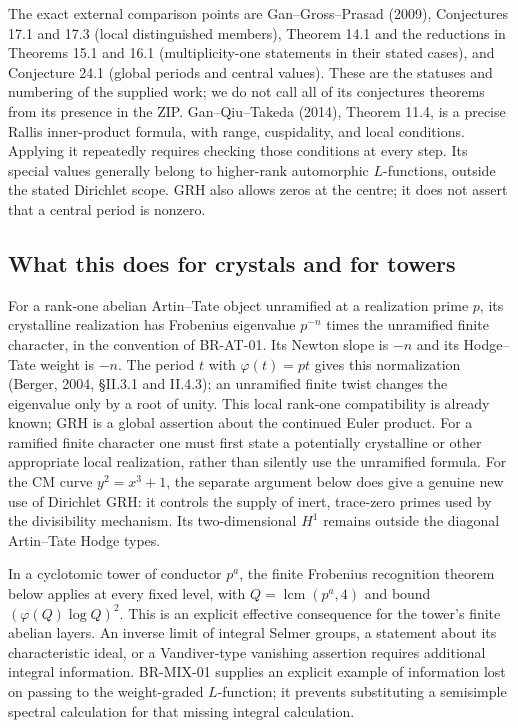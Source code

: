 The exact external comparison points are Gan--Gross--Prasad
(2009), Conjectures 17.1 and 17.3 (local distinguished members),
Theorem 14.1 and the reductions in Theorems 15.1 and 16.1
(multiplicity-one statements in their stated cases), and
Conjecture 24.1 (global periods and central values).  These are
the statuses and numbering of the supplied work; we do not call
all of its conjectures theorems from its presence in the ZIP.
Gan--Qiu--Takeda (2014), Theorem 11.4, is a precise Rallis
inner-product formula, with range, cuspidality, and local
conditions.  Applying it repeatedly requires checking those
conditions at every step.  Its special values generally belong
to higher-rank automorphic $L$-functions, outside the stated
Dirichlet scope.  GRH also allows zeros at the centre; it does
not assert that a central period is nonzero.

\subsection{What this does for crystals and for towers}

For a rank-one abelian Artin--Tate object unramified at a
realization prime $p$, its crystalline realization has Frobenius
eigenvalue $p^{-n}$ times the unramified finite character, in the
convention of BR-AT-01.  Its Newton slope is $-n$ and its
Hodge--Tate weight is $-n$.  The period $t$ with $\varphi(t)=pt$ gives this normalization
(Berger, 2004, \S II.3.1 and II.4.3); an unramified finite twist
changes the eigenvalue only by a root of unity.  This local rank-one
compatibility is already known; GRH is a global assertion about the continued
Euler product.  For a ramified finite character one must first
state a potentially crystalline or other appropriate local
realization, rather than silently use the unramified formula.
For the CM curve $y^2=x^3+1$, the separate argument below does
give a genuine new use of Dirichlet GRH: it controls the supply
of inert, trace-zero primes used by the divisibility mechanism.
Its two-dimensional $H^1$ remains outside the diagonal
Artin--Tate Hodge types.

In a cyclotomic tower of conductor $p^a$, the finite Frobenius
recognition theorem below applies at every fixed level, with
$Q=\operatorname{lcm}(p^a,4)$ and bound
$(\varphi(Q)\log Q)^2$.  This is an explicit effective
consequence for the tower's finite abelian layers.  An inverse
limit of integral Selmer groups, a statement about its
characteristic ideal, or a Vandiver-type vanishing assertion
requires additional integral information.  BR-MIX-01 supplies
an explicit example of information lost on passing to the
weight-graded $L$-function; it prevents substituting a
semisimple spectral calculation for that missing integral
calculation.

